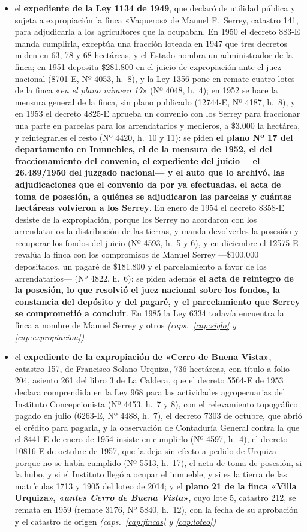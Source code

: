 \begin{itemize}[leftmargin=*]
\item el \textbf{expediente de la Ley 1134 de 1949}, que declaró de utilidad pública y sujeta a expropiación la finca «Vaqueros» de Manuel F.\ Serrey, catastro 141, para adjudicarla a los agricultores que la ocupaban. En 1950 el decreto 883-E manda cumplirla, exceptúa una fracción loteada en 1947 que tres decretos miden en 63, 78 y 68 hectáreas, y el Estado nombra un administrador de la finca; en 1951 deposita \$281.800 en el juicio de expropiación ante el juez nacional (8701-E, Nº 4053, h.\ 8), y la Ley 1356 pone en remate cuatro lotes de la finca «\textit{en el plano número 17}» (Nº 4048, h.\ 4); en 1952 se hace la mensura general de la finca, sin plano publicado (12744-E, Nº 4187, h.\ 8), y en 1953 el decreto 4825-E aprueba un convenio con los Serrey para fraccionar una parte en parcelas para los arrendatarios y medieros, a \$3.000 la hectárea, y reintegrarles el resto (Nº 4420, h.\ 10 y 11): se piden \textbf{el plano Nº 17 del departamento en Inmuebles, el de la mensura de 1952, el del fraccionamiento del convenio, el expediente del juicio ---el 26.489/1950 del juzgado nacional--- y el auto que lo archivó, las adjudicaciones que el convenio da por ya efectuadas, el acta de toma de posesión, a quiénes se adjudicaron las parcelas y cuántas hectáreas volvieron a los Serrey}. En enero de 1954 el decreto 8358-E desiste de la expropiación, porque los Serrey no acordaron con los arrendatarios la distribución de las tierras, y manda devolverles la posesión y recuperar los fondos del juicio (Nº 4593, h.\ 5 y 6), y en diciembre el 12575-E revalúa la finca con los compromisos de Manuel Serrey ---\$100.000 depositados, un pagaré de \$181.800 y el parcelamiento a favor de los arrendatarios--- (Nº 4822, h.\ 6): se piden además \textbf{el acta de reintegro de la posesión, lo que resolvió el juez nacional sobre los fondos, la constancia del depósito y del pagaré, y el parcelamiento que Serrey se comprometió a concluir}. En 1985 la Ley 6334 todavía encuentra la finca a nombre de Manuel Serrey y otros \textit{(caps.\ \ref{cap:siglo} y \ref{cap:expropiacion})}
\item el \textbf{expediente de la expropiación de «Cerro de Buena Vista»}, catastro 157, de Francisco Solano Urquiza, 736 hectáreas, con título a folio 204, asiento 261 del libro 3 de La Caldera, que el decreto 5564-E de 1953 declara comprendida en la Ley 968 para las actividades agropecuarias del Instituto Concepcionista (Nº 4453, h.\ 7 y 8), con el relevamiento topográfico pagado en julio (6263-E, Nº 4488, h.\ 7), el decreto 7303 de octubre, que abrió el crédito para pagarla, y la observación de Contaduría General contra la que el 8441-E de enero de 1954 insiste en cumplirlo (Nº 4597, h.\ 4), el decreto 10816-E de octubre de 1957, que la deja sin efecto a pedido de Urquiza porque no se había cumplido (Nº 5513, h.\ 17), el acta de toma de posesión, si la hubo, y si el Instituto llegó a ocupar el inmueble, y si es la tierra de las matrículas 1713 y 1905 del loteo de 2014; y el \textbf{plano 21 de la finca «Villa Urquiza», «\textit{antes Cerro de Buena Vista}»}, cuyo lote 5, catastro 212, se remata en 1959 (remate 3176, Nº 5840, h.\ 12), con la fecha de su aprobación y el catastro de origen \textit{(caps.\ \ref{cap:fincas} y \ref{cap:loteo})}

\end{itemize}
